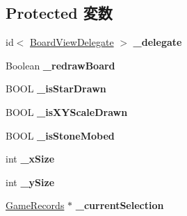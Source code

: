 \subsection*{Protected 変数}
\begin{DoxyCompactItemize}
\item 
\hypertarget{interface_board_view_afbb741010571202a5b270c4521c52c03}{
id$<$ \hyperlink{protocol_board_view_delegate-p}{BoardViewDelegate} $>$ {\bfseries \_\-delegate}}
\label{interface_board_view_afbb741010571202a5b270c4521c52c03}

\item 
\hypertarget{interface_board_view_a190d16ef976d1b061da3d24ec25bad84}{
Boolean {\bfseries \_\-redrawBoard}}
\label{interface_board_view_a190d16ef976d1b061da3d24ec25bad84}

\item 
\hypertarget{interface_board_view_ad4989ff0737c80e88b737b48f0ab7c89}{
BOOL {\bfseries \_\-isStarDrawn}}
\label{interface_board_view_ad4989ff0737c80e88b737b48f0ab7c89}

\item 
\hypertarget{interface_board_view_ad4f563bf4e7fd5a54953dbb85c1b4ba3}{
BOOL {\bfseries \_\-isXYScaleDrawn}}
\label{interface_board_view_ad4f563bf4e7fd5a54953dbb85c1b4ba3}

\item 
\hypertarget{interface_board_view_a4fc8faf205467309abd8af760d9e9e86}{
BOOL {\bfseries \_\-isStoneMobed}}
\label{interface_board_view_a4fc8faf205467309abd8af760d9e9e86}

\item 
\hypertarget{interface_board_view_ac02174b90d76f01f5641563c9a6675c2}{
int {\bfseries \_\-xSize}}
\label{interface_board_view_ac02174b90d76f01f5641563c9a6675c2}

\item 
\hypertarget{interface_board_view_a56becca2fd671b02acf25bc838c20bbb}{
int {\bfseries \_\-ySize}}
\label{interface_board_view_a56becca2fd671b02acf25bc838c20bbb}

\item 
\hypertarget{interface_board_view_a67d40f51a96e539f814a361c35e63c30}{
\hyperlink{interface_game_records}{GameRecords} $\ast$ {\bfseries \_\-currentSelection}}
\label{interface_board_view_a67d40f51a96e539f814a361c35e63c30}

\end{DoxyCompactItemize}
